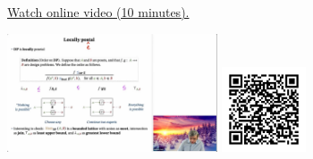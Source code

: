 
\begin{minipage}{10cm}
    \href{https://act4e-spring21.netlify.app/videos/spring2021-functorial-comp-b:solving-queries:or-and-and.html}{Watch online video (10 minutes).}
        
    \href{https://act4e-spring21.netlify.app/videos/spring2021-functorial-comp-b:solving-queries:or-and-and.html}{\includegraphics[height=3.5cm]{spring2021-functorial-comp-b:solving-queries:or-and-and/thumbnails.jpg}}
    \href{https://act4e-spring21.netlify.app/videos/spring2021-functorial-comp-b:solving-queries:or-and-and.html}{\includegraphics[height=2.5cm]{spring2021-functorial-comp-b:solving-queries:or-and-and/qrcode.png}}
\end{minipage}
